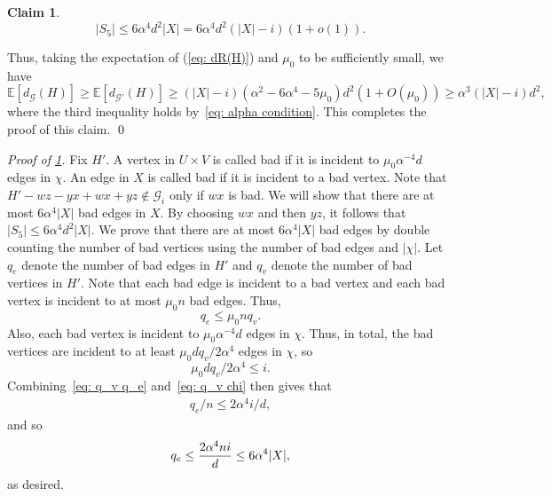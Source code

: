 \documentclass[11pt]{article}
\theoremstyle{plain}
\newtheorem{claim}{Claim}[thm]
\begin{document}
    \begin{claim}\label{clm: S5}
        \[
        |S_5| \leq 6\alpha^4d^2|X| = 6\alpha^4d^2(|X| - i)(1 + o(1)).
        \]
    \end{claim}

    
    Thus, taking the expectation of (\ref{eq: dR(H)}) and $\mu_0$ to be sufficiently small, we have 
    \begin{equation}
        \mathbb E [d_{\mathscr G}(H)]\ge \mathbb E [d_{\mathscr G'}(H)] \geq (|X| - i)(\alpha^2 - 6\alpha^4 - 5\mu_0)d^2(1 + O(\mu_0)) \geq \alpha^3(|X| - i)d^2,
    \end{equation}
    where the third inequality holds by~\eqref{eq: alpha condition}. This completes the proof of this claim.
    \qed

    \medskip
    
    \noindent\textit{Proof of \cref{clm: S5}.}
        Fix $H'$. A vertex in $U \times V$ is called bad if it is incident to $\mu_0\alpha^{-4}d$ edges in $\chi$. An edge in $X$ is called bad if it is incident to a bad vertex. Note that $H' - wz - yx + wx + yz \notin \mathcal G_i$ only if $wx$ is bad. We will show that there are at most $6\alpha^4|X|$ bad edges in $X$. By choosing $wx$ and then $yz$, it follows that $|S_5| \leq 6\alpha^4d^2|X|$.  We prove that there are at most $6\alpha^4|X|$ bad edges by double counting the number of bad vertices using the number of bad edges and $|\chi|$. Let $q_e$ denote the number of bad edges in $H'$ and $q_v$ denote the number of bad vertices in $H'$. Note that each bad edge is incident to a bad vertex and each bad vertex is incident to at most $\mu_0n$ bad edges. Thus, 
        \begin{equation}\label{eq: q_v q_e}
            q_e \leq \mu_0nq_v.
        \end{equation}
        Also, each bad vertex is incident to $\mu_0\alpha^{-4}d$ edges in $\chi$. Thus, in total, the bad vertices are incident to at least $\mu_0dq_v/2\alpha^4$ edges in $\chi$, so
        \begin{equation}\label{eq: q_v chi}
            \mu_0dq_v/2\alpha^4 \leq i.
        \end{equation}
        Combining~\eqref{eq: q_v q_e} and~\eqref{eq: q_v chi} then gives that 
        \begin{align*}
            q_e/n \leq 2\alpha^4i/d,
        \end{align*}
        and so 
        \begin{equation}\notag
            q_e \leq \frac{2\alpha^4ni}{d} \leq 6\alpha^4|X|,
        \end{equation}
        as desired.
\end{document}
